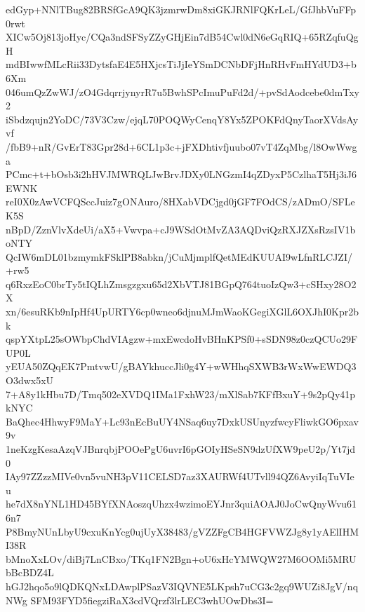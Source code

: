 edGyp+NNlTBug82BRSfGcA9QK3jzmrwDm8xiGKJRNlFQKrLeL/GfJhbVuFFp0rwt
XICw5Oj813joHyc/CQa3ndSFSyZZyGHjEin7dB54Cwl0dN6eGqRIQ+65RZqfuQgH
mdBIwwfMLcRii33DytsfaE4E5HXjcsTiJjIeYSmDCNbDFjHnRHvFmHYdUD3+b6Xm
046umQzZwWJ/zO4GdqrrjynyrR7u5BwhSPcImuPuFd2d/+pvSdAodcebe0dmTxy2
iSbdzqujn2YoDC/73V3Czw/ejqL70POQWyCenqY8Yx5ZPOKFdQnyTaorXVdsAyvf
/fbB9+nR/GvErT83Gpr28d+6CL1p3c+jFXDhtivfjuubo07vT4ZqMbg/l8OwWwga
PCmc+t+bOsb3i2hHVJMWRQLJwBrvJDXy0LNGzmI4qZDyxP5CzlhaT5Hj3iJ6EWNK
reI0X0zAwVCFQSccJuiz7gONAuro/8HXabVDCjgd0jGF7FOdCS/zADmO/SFLeK5S
nBpD/ZznVlvXdeUi/aX5+Vwvpa+cJ9WSdOtMvZA3AQDviQzRXJZXsRzsIV1boNTY
QcIW6mDL01bzmymkFSklPB8abkn/jCuMjmplfQetMEdKUUAI9wLfnRLCJZI/+rw5
q6RxzEoC0brTy5tIQLhZmsgzgxu65d2XbVTJ81BGpQ764tuoIzQw3+cSHxy28O2X
xn/6esuRKb9nIpHf4UpURTY6cp0wneo6djnuMJmWaoKGegiXGlL6OXJhI0Kpr2bk
qspYXtpL25sOWbpChdVIAgzw+mxEwcdoHvBHnKPSf0+sSDN98z0czQCUo29FUP0L
yEUA50ZQqEK7PmtvwU/gBAYkhuccJli0g4Y+wWHhqSXWB3rWxWwEWDQ3O3dwx5xU
7+A8y1kHbu7D/Tmq502eXVDQ1IMa1FxhW23/mXlSab7KFfBxuY+9s2pQy41pkNYC
BaQhec4HhwyF9MaY+Lc93nEcBuUY4NSaq6uy7DxkUSUnyzfwcyFliwkGO6pxav9v
1neKzgKesaAzqVJBnrqbjPOOePgU6uvrI6pGOIyHSeSN9dzUfXW9peU2p/Yt7jd0
IAy97ZZzzMIVe0vn5vuNH3pV11CELSD7az3XAURWf4UTvll94QZ6AvyiIqTuVIeu
he7dX8nYNL1HD45BYfXNAoszqUhzx4wzimoEYJnr3quiAOAJ0JoCwQnyWvu616n7
P8BmyNUnLbyU9cxuKnYcg0ujUyX38483/gVZZFgCB4HGFVWZJg8y1yAElIHMI38R
bMnoXxLOv/diBj7LnCBxo/TKq1FN2Bgn+oU6xHcYMWQW27M6OOMi5MRUbBcBDZ4L
hGJ2hqo5o9lQDKQNxLDAwplPSazV3IQVNE5LKpsh7uCG3c2gq9WUZi8JgV/nqNWg
SFM93FYD5fiegziRaX3cdVQrzf3lrLEC3whUOwDbs3I=
